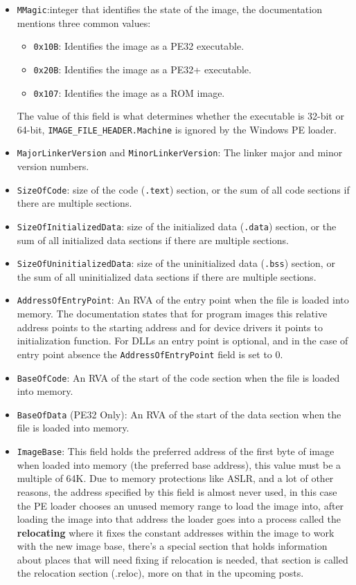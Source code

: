 \begin{itemize}
    \item \verb+MMagic+:integer that identifies the state of the image, the documentation mentions three common values:
        \begin{itemize}
            \item \verb+0x10B+: Identifies the image as a PE32 executable.
            \item \verb+0x20B+: Identifies the image as a PE32+ executable.
            \item \verb+0x107+: Identifies the image as a ROM image.
        \end{itemize}
    The value of this field is what determines whether the executable is 32-bit or 64-bit, \verb+IMAGE_FILE_HEADER.Machine+ is ignored by the Windows PE loader.
    \item \verb+MajorLinkerVersion+ and \verb+MinorLinkerVersion+: The linker major and minor version numbers.
    \item \verb+SizeOfCode+: size of the code (\verb+.text+) section, or the sum of all code sections if there are multiple sections.
    \item \verb+SizeOfInitializedData+: size of the initialized data (\verb+.data+) section, or the sum of all initialized data sections if there are multiple sections.
    \item \verb+SizeOfUninitializedData+: size of the uninitialized data (\verb+.bss+) section, or the sum of all uninitialized data sections if there are multiple sections.
    \item \verb+AddressOfEntryPoint+: An RVA of the entry point when the file is loaded into memory. The documentation states that for program images this relative address points to the starting address and for device drivers it points to initialization function. For DLLs an entry point is optional, and in the case of entry point absence the \verb+AddressOfEntryPoint+ field is set to 0.
    \item \verb+BaseOfCode+: An RVA of the start of the code section when the file is loaded into memory.
    \item \verb+BaseOfData+ (PE32 Only): An RVA of the start of the data section when the file is loaded into memory.
    \item \verb+ImageBase+: This field holds the preferred address of the first byte of image when loaded into memory (the preferred base address), this value must be a multiple of 64K. Due to memory protections like ASLR, and a lot of other reasons, the address specified by this field is almost never used, in this case the PE loader chooses an unused memory range to load the image into, after loading the image into that address the loader goes into a process called the {\bf relocating} where it fixes the constant addresses within the image to work with the new image base, there’s a special section that holds information about places that will need fixing if relocation is needed, that section is called the relocation section (.reloc), more on that in the upcoming posts.

\end{itemize}
